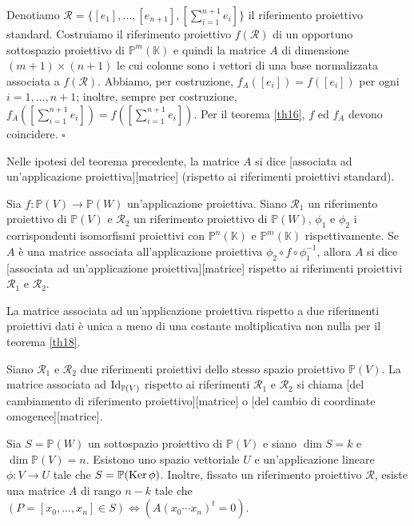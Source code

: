 \Proof Denotiamo $\mathcal{R} = \lbrace [e_1], ..., [e_{n + 1}], [\sum_{i = 1}^{n + 1} e_i] \rbrace$ il riferimento proiettivo standard. Costruiamo il riferimento proiettivo $f(\mathcal{R})$ di un opportuno sottospazio proiettivo di $\mathbb{P}^m(\mathbb{K})$ e quindi la matrice $A$ di dimensione $(m + 1) \times (n + 1)$ le cui colonne sono i vettori di una base normalizzata associata a $f(\mathcal{R})$. Abbiamo, per costruzione, $f_A([e_i]) = f([e_i])$ per ogni $i = 1, ..., n + 1$; inoltre, sempre per costruzione, $f_A([\sum_{i = 1}^{n + 1} e_i]) = f([\sum_{i = 1}^{n + 1} e_ i])$. Per il teorema \ref{th16}, $f$ ed $f_A$ devono coincidere. $\square$
\begin{Definition}\label{def19}
	Nelle ipotesi del teorema precedente, la matrice $A$ si dice [associata ad un'applicazione proiettiva][matrice] (rispetto ai riferimenti proiettivi standard).
\end{Definition}
\begin{Definition}\label{def20}
	Sia $f: \mathbb{P}(V) \rightarrow \mathbb{P}(W)$ un'applicazione proiettiva. Siano $\mathcal{R}_1$ un riferimento proiettivo di $\mathbb{P}(V)$ e $\mathcal{R}_2$ un riferimento proiettivo di $\mathbb{P}(W)$, $\phi_1$ e $\phi_2$ i corrispondenti isomorfismi proiettivi con $\mathbb{P}^n(\mathbb{K})$ e $\mathbb{P}^m(\mathbb{K})$ rispettivamente. Se $A$ \`e una matrice associata all'applicazione proiettiva $\phi_2 \circ f \circ \phi_1^{-1}$, allora $A$ si dice [associata ad un'applicazione proiettiva][matrice] rispetto ai riferimenti proiettivi $\mathcal{R}_1$ e $\mathcal{R}_2$.
\end{Definition}
	\par La matrice associata ad un'applicazione proiettiva rispetto a due riferimenti proiettivi dati \`e unica a meno di una costante moltiplicativa non nulla per il teorema \ref{th18}.
\begin{Definition}\label{def21}
	Siano $\mathcal{R}_1$ e $\mathcal{R}_2$ due riferimenti proiettivi dello stesso spazio proiettivo $\mathbb{P}(V)$. La matrice associata ad $\Identity_{\mathbb{P}(V)}$ rispetto ai riferimenti $\mathcal{R}_1$ e $\mathcal{R}_2$ si chiama [del cambiamento di riferimento proiettivo][matrice] o [del cambio di coordinate omogenee][matrice].
\end{Definition}
\begin{Theorem}\label{th20}
	Sia $S = \mathbb{P}(W)$ un sottospazio proiettivo di $\mathbb{P}(V)$ e siano $\dim S = k$ e $\dim \mathbb{P}(V) = n$. Esistono uno spazio vettoriale $U$ e un'applicazione lineare $\phi: V \rightarrow U$ tale che $S = \mathbb{P}(\operatorname{Ker} \phi)$. Inoltre, fissato un riferimento proiettivo $\mathcal{R}$, esiste una matrice $A$ di rango $n - k$ tale che $(P = [x_0, ..., x_n] \in S) \Leftrightarrow (A (x_0 \cdots x_n)^t = 0)$.
\end{Theorem}
